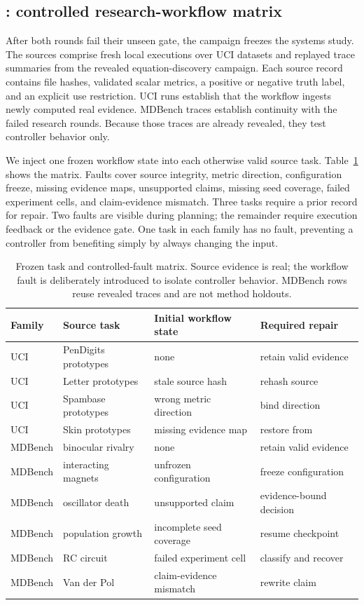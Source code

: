 \subsection{\routeb{}: controlled research-workflow matrix}

After both \routea{} rounds fail their unseen gate, the campaign freezes the
systems study. The sources comprise \UciTaskCount{} fresh local executions
over UCI datasets \cite{dua2019uci} and \MDBenchTaskCount{} replayed trace
summaries from the revealed equation-discovery campaign. Each source record
contains file hashes, validated scalar metrics, a positive or negative truth
label, and an explicit use restriction. UCI runs establish that the workflow
ingests newly computed real evidence. MDBench traces establish continuity
with the failed research rounds. Because those traces are already revealed,
they test controller behavior only.

We inject one frozen workflow state into each otherwise valid source task.
Table~\ref{tab:tasks} shows the matrix. Faults cover source integrity,
metric direction, configuration freeze, missing evidence maps, unsupported
claims, missing seed coverage, failed experiment cells, and
claim-evidence mismatch. Three tasks require a prior \vault{} record for
repair. Two faults are visible during planning; the remainder require
execution feedback or the evidence gate. One task in each family has no
fault, preventing a controller from benefiting simply by always changing the
input.

\begin{table}[t]
\centering
\caption{Frozen task and controlled-fault matrix. Source evidence is real;
the workflow fault is deliberately introduced to isolate controller
behavior. MDBench rows reuse revealed traces and are not method holdouts.}
\label{tab:tasks}
\small
\begin{tabular}{llll}
\toprule
Family & Source task & Initial workflow state & Required repair \\
\midrule
UCI & PenDigits prototypes & none & retain valid evidence \\
UCI & Letter prototypes & stale source hash & rehash source \\
UCI & Spambase prototypes & wrong metric direction & bind direction \\
UCI & Skin prototypes & missing evidence map & restore from \vault{} \\
\midrule
MDBench & binocular rivalry & none & retain valid evidence \\
MDBench & interacting magnets & unfrozen configuration & freeze configuration \\
MDBench & oscillator death & unsupported claim & evidence-bound decision \\
MDBench & population growth & incomplete seed coverage & resume checkpoint \\
MDBench & RC circuit & failed experiment cell & classify and recover \\
MDBench & Van der Pol & claim-evidence mismatch & rewrite claim \\
\bottomrule
\end{tabular}
\end{table}

